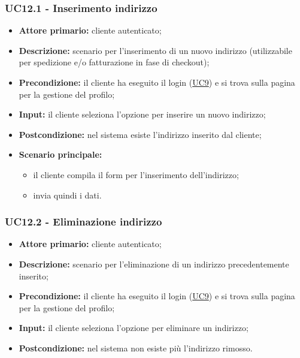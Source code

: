 \subsubsection{UC12.1 - Inserimento indirizzo}
\label{UC12.1}
\begin{itemize}
    \item \textbf{Attore primario:} cliente autenticato;
    \item \textbf{Descrizione:} scenario per l'inserimento di un nuovo indirizzo (utilizzabile per spedizione e/o fatturazione in fase di checkout);
    \item \textbf{Precondizione:} il cliente ha eseguito il login (\hyperref[UC9]{UC9}) e si trova sulla pagina per la gestione del profilo;
    \item \textbf{Input:} il cliente seleziona l'opzione per inserire un nuovo indirizzo;
    \item \textbf{Postcondizione:} nel sistema esiste l'indirizzo inserito dal cliente;
    \item \textbf{Scenario principale:}
    \begin{itemize}
        \item il cliente compila il form per l'inserimento dell'indirizzo;
        \item invia quindi i dati.
    \end{itemize}
\end{itemize}

\subsubsection{UC12.2 - Eliminazione indirizzo}
\label{UC12.2}
\begin{itemize}
    \item \textbf{Attore primario:} cliente autenticato;
    \item \textbf{Descrizione:} scenario per l'eliminazione di un indirizzo precedentemente inserito;
    \item \textbf{Precondizione:} il cliente ha eseguito il login (\hyperref[UC9]{UC9}) e si trova sulla pagina per la gestione del profilo;
    \item \textbf{Input:} il cliente seleziona l'opzione per eliminare un indirizzo;
    \item \textbf{Postcondizione:} nel sistema non esiste più l'indirizzo rimosso.
\end{itemize}

